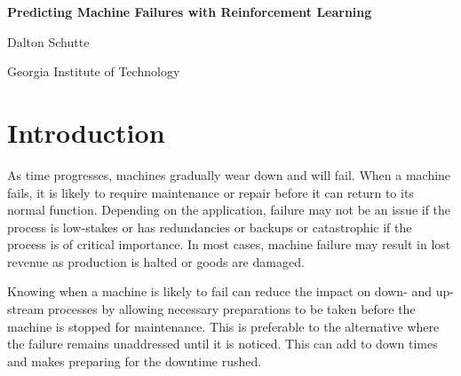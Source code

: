 \documentclass[12pt]{article}
\begin{document}
\baselineskip 12pt

\begin{center}
\textbf{\Large Predicting Machine Failures with Reinforcement Learning}

\vspace{1.5cc}
{ \sc Dalton Schutte}\\

\vspace{0.3 cm}

{\small Georgia Institute of Technology}
\end{center}
\vspace{1.5cc}



\begin{abstract}
  \noindent We investigate methods from statistical process control, deep learning, and reinforcement learning
  for predicting when two machines will fail. Each machine is fitted with sensors that report data at semi-regular
  intervals for each time step. Our results suggest that there is promise in reinforcement learning agents trained
  using proximal policy optimization. Our findings also suggest that there is value in daily generated T$^2$ control
  charts. The state of the art time series transformer model could not be trained so we do not make an assessment of
  its abilities, however, given the nature of the model it may be worth additional troubleshooting to evaluate its
  potential. Ultimately, the control charts are likely the best performance to cost option due to the lower compute, 
  expertise, and data availability they require.
\end{abstract}



\section{Introduction} \label{form}

As time progresses, machines gradually wear down and will fail. When a machine fails,
it is likely to require maintenance or repair before it can return to its normal function.
Depending on the application, failure may not be an issue if the process is low-stakes or
has redundancies or backups or catastrophic if the process is of critical importance. In
most cases, machine failure may result in lost revenue as production is halted or goods
are damaged.

Knowing when a machine is likely to fail can reduce the impact on down- and up-stream
processes by allowing necessary preparations to be taken before the machine is stopped
for maintenance. This is preferable to the alternative where the failure remains unaddressed
until it is noticed. This can add to down times and makes preparing for the downtime 
rushed.
\end{document}
